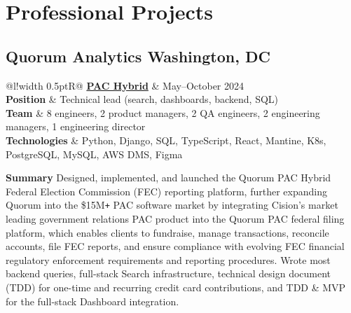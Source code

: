 \documentclass[]{article}
\newcommand\VRule{\color{lightgray}\vrule width 0.5pt}
\def\Plus{\texttt{+}}
\begin{document}
\section*{Professional Projects}
\subsection*{Quorum Analytics \hfill \textnormal{Washington, DC}}


\begin{tabular}{@{}l!{\VRule}R@{}}
	{\bf \href{https://www.quorum.us/products/pac/}{PAC Hybrid}} & {\footnotesize May–October 2024}\\
	\textbf{Position} & Technical lead (search, dashboards, backend, SQL)\\
	\textbf{Team} & 8 engineers, 2 product managers, 2 QA engineers, 2 engineering managers, 1 engineering director\\
	\textbf{Technologies} & Python, Django, SQL, TypeScript, React, Mantine, K8s, PostgreSQL, MySQL, AWS DMS, Figma \\
\end{tabular}

\textbf{Summary}
Designed, implemented, and launched the Quorum PAC Hybrid Federal Election Commission (FEC) reporting platform, further expanding Quorum into the \$15M{\Plus} PAC software market by integrating Cision's market leading government relations PAC product into the Quorum PAC federal filing platform, which enables clients to fundraise, manage transactions, reconcile accounts, file FEC reports, and ensure compliance with evolving FEC financial regulatory enforcement requirements and reporting procedures. Wrote most backend queries, full-stack Search infrastructure, technical design document (TDD) for one-time and recurring credit card contributions, and TDD \& MVP for the full-stack Dashboard integration.
\end{document}
